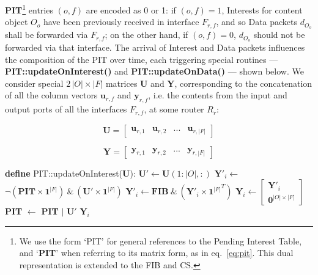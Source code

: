 \textbf{PIT}\footnote{We use the form `PIT' for general references to the Pending 
Interest Table, and `\textbf{PIT}' when referring to its matrix form, as in eq.~\ref{eq:pit}. 
This dual representation is extended to the FIB and CS.} entries 
$(o,f)$ are encoded as 0 or 1: if $(o,f) = 1$, Interests for content object 
$O_o$ have been previously received in interface $F_{r,f}$, and so Data 
packets $d_{O_o}$ shall be forwarded via $F_{r,f}$; on the other hand, 
if $(o,f) = 0$, $d_{O_o}$ should not be forwarded via that 
interface. The arrival of Interest and Data packets influences the composition of 
the PIT over time, each triggering special routines --- \textbf{PIT::updateOnInterest()} and 
\textbf{PIT::updateOnData()} --- shown below. We consider 
special $2\,|O| \times |F|$ matrices \textbf{U} and \textbf{Y}, corresponding to the concatenation of 
all the column vectors $\textbf{u}_{r,f}$ and $\textbf{y}_{r,f}$, i.e. the contents from the input and output ports 
of all the interfaces $F_{r,f}$, at some router $R_r$:

\begin{equation}
\textbf{U} = \begin{bmatrix} \textbf{u}_{r,1} & \textbf{u}_{r,2} & ... & \textbf{u}_{r,|F|} \end{bmatrix}
    \label{eq:a}
\end{equation}

\begin{equation}
\textbf{Y} = \begin{bmatrix} \textbf{y}_{r,1} & \textbf{y}_{r,2} & ... & \textbf{y}_{r,|F|} \end{bmatrix}
    \label{eq:b}
\end{equation}\shortvertbreak

\begin{algorithmic}[1]

\State \textbf{define} PIT::updateOnInterest(\textbf{U}):
    \Statex[2]
    \State $\textbf{U}' \leftarrow \textbf{U}(1:|O|,:)$
    \State $\textbf{Y}'_i \leftarrow$ $\neg(\textbf{PIT} \times \textbf{1}^{|F|}) \ \& \ (\textbf{U}' \times \textbf{1}^{|F|})$
    \State $\textbf{Y}'_i \leftarrow \textbf{FIB} \ \& \ (\textbf{Y}'_i \times {\textbf{1}^{|F|}}^{T})$
    \State $\textbf{Y}_i \leftarrow \begin{bmatrix} \textbf{Y}'_i \\ \textbf{0}^{|O| \times |F|} \end{bmatrix}$
    \State \textbf{PIT} $\leftarrow$ \textbf{PIT} $|$ $\textbf{U}'$ 
    \State \Return $\textbf{Y}_i$

\end{algorithmic}\shortvertbreak

